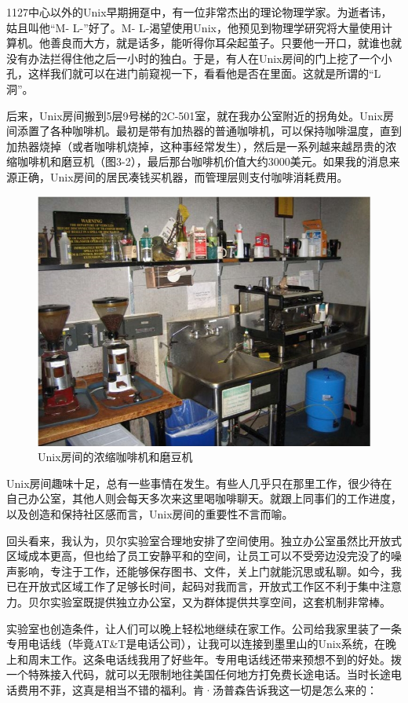 \documentclass[a4paper,12pt,UTF8,twoside]{ctexbook}
\begin{document}
1127中心以外的Unix早期拥趸中，有一位非常杰出的理论物理学家。为逝者讳，姑且叫他“M- L-”好了。M- L-渴望使用Unix，他预见到物理学研究将大量使用计算机。他善良而大方，就是话多，能听得你耳朵起茧子。只要他一开口，就谁也就没有办法拦得住他之后一小时的独白。于是，有人在Unix房间的门上挖了一个小孔，这样我们就可以在进门前窥视一下，看看他是否在里面。这就是所谓的“L洞”。

后来，Unix房间搬到5层9号梯的2C-501室，就在我办公室附近的拐角处。Unix房间添置了各种咖啡机。最初是带有加热器的普通咖啡机，可以保持咖啡温度，直到加热器烧掉（或者咖啡机烧掉，这种事经常发生），然后是一系列越来越昂贵的浓缩咖啡机和磨豆机（图3-2），最后那台咖啡机价值大约3000美元。如果我的消息来源正确，Unix房间的居民凑钱买机器，而管理层则支付咖啡消耗费用。

\begin{figure}[htbp]
	\centering
	\includegraphics[width=0.7\linewidth]{20}
	\caption{Unix房间的浓缩咖啡机和磨豆机}
	\label{fig:1}
\end{figure}

Unix房间趣味十足，总有一些事情在发生。有些人几乎只在那里工作，很少待在自己办公室，其他人则会每天多次来这里喝咖啡聊天。就跟上同事们的工作进度，以及创造和保持社区感而言，Unix房间的重要性不言而喻。

回头看来，我认为，贝尔实验室合理地安排了空间使用。独立办公室虽然比开放式区域成本更高，但也给了员工安静平和的空间，让员工可以不受旁边没完没了的噪声影响，专注于工作，还能够保存图书、文件，关上门就能沉思或私聊。如今，我已在开放式区域工作了足够长时间，起码对我而言，开放式工作区不利于集中注意力。贝尔实验室既提供独立办公室，又为群体提供共享空间，这套机制非常棒。

实验室也创造条件，让人们可以晚上轻松地继续在家工作。公司给我家里装了一条专用电话线（毕竟AT\&T是电话公司），让我可以连接到墨里山的Unix系统，在晚上和周末工作。这条电话线我用了好些年。专用电话线还带来预想不到的好处。拨一个特殊接入代码，就可以无限制地往美国任何地方打免费长途电话。当时长途电话费用不菲，这真是相当不错的福利。肯·汤普森告诉我这一切是怎么来的：
\end{document}
